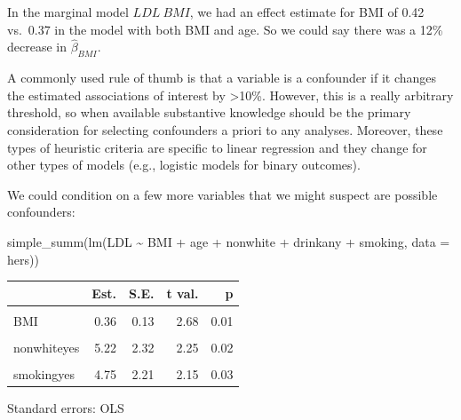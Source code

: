 \documentclass[
  letterpaper,
  DIV=11,
  numbers=noendperiod]{scrreport}
\newenvironment{Shaded}{\begin{snugshade}}{\end{snugshade}}
\newcommand{\AttributeTok}[1]{\textcolor[rgb]{0.40,0.45,0.13}{#1}}
\newcommand{\FunctionTok}[1]{\textcolor[rgb]{0.28,0.35,0.67}{#1}}
\newcommand{\NormalTok}[1]{\textcolor[rgb]{0.00,0.23,0.31}{#1}}
\newcommand{\SpecialCharTok}[1]{\textcolor[rgb]{0.37,0.37,0.37}{#1}}
\begin{document}
In the marginal model \(LDL ~ BMI\), we had an effect estimate for BMI
of 0.42 vs.~0.37 in the model with both BMI and age. So we could say
there was a 12\% decrease in \(\hat \beta_{BMI}\).

A commonly used rule of thumb is that a variable is a confounder if it
changes the estimated associations of interest by \textgreater10\%.
However, this is a really arbitrary threshold, so when available
substantive knowledge should be the primary consideration for selecting
confounders a priori to any analyses. Moreover, these types of heuristic
criteria are specific to linear regression and they change for other
types of models (e.g., logistic models for binary outcomes).

We could condition on a few more variables that we might suspect are
possible confounders:

\begin{Shaded}
\begin{Highlighting}[]
\FunctionTok{simple\_summ}\NormalTok{(}\FunctionTok{lm}\NormalTok{(LDL }\SpecialCharTok{\textasciitilde{}}\NormalTok{ BMI }\SpecialCharTok{+}\NormalTok{ age }\SpecialCharTok{+}\NormalTok{ nonwhite }\SpecialCharTok{+}\NormalTok{ drinkany }\SpecialCharTok{+}\NormalTok{ smoking, }\AttributeTok{data =}\NormalTok{ hers))}
\end{Highlighting}
\end{Shaded}

\begin{table}[!h]
\centering
\begin{threeparttable}
\begin{tabular}{lrrrr}
\toprule
  & Est. & S.E. & t val. & p\\
\midrule
\cellcolor{gray!6}{(Intercept)} & \cellcolor{gray!6}{147.32} & \cellcolor{gray!6}{9.26} & \cellcolor{gray!6}{15.91} & \cellcolor{gray!6}{0.00}\\
BMI & 0.36 & 0.13 & 2.68 & 0.01\\
\cellcolor{gray!6}{age} & \cellcolor{gray!6}{-0.19} & \cellcolor{gray!6}{0.11} & \cellcolor{gray!6}{-1.68} & \cellcolor{gray!6}{0.09}\\
nonwhiteyes & 5.22 & 2.32 & 2.25 & 0.02\\
\cellcolor{gray!6}{drinkanyyes} & \cellcolor{gray!6}{-2.72} & \cellcolor{gray!6}{1.50} & \cellcolor{gray!6}{-1.82} & \cellcolor{gray!6}{0.07}\\
\addlinespace
smokingyes & 4.75 & 2.21 & 2.15 & 0.03\\
\bottomrule
\end{tabular}
\begin{tablenotes}
\item Standard errors: OLS
\end{tablenotes}
\end{threeparttable}
\end{table}
\end{document}
